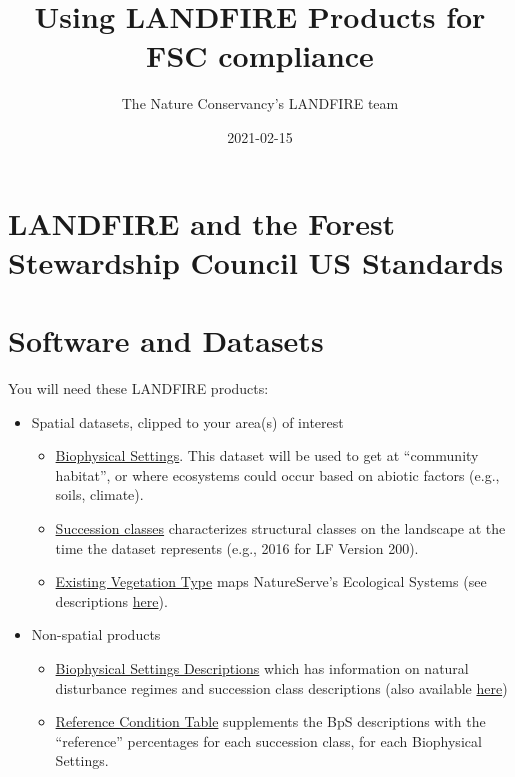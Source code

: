 \documentclass[
]{book}
\title{Using LANDFIRE Products for FSC compliance}
\author{The Nature Conservancy's LANDFIRE team}
\date{2021-02-15}
\providecommand{\tightlist}{%
  \setlength{\itemsep}{0pt}\setlength{\parskip}{0pt}}
\begin{document}
\maketitle

{
\setcounter{tocdepth}{1}
\tableofcontents
}
\hypertarget{landfire-and-the-forest-stewardship-council-us-standards}{%
\chapter{LANDFIRE and the Forest Stewardship Council US Standards}\label{landfire-and-the-forest-stewardship-council-us-standards}}

\hypertarget{softAndData}{%
\chapter{Software and Datasets}\label{softAndData}}

You will need these LANDFIRE products:

\begin{itemize}
\tightlist
\item
  Spatial datasets, clipped to your area(s) of interest

  \begin{itemize}
  \tightlist
  \item
    \href{https://www.landfire.gov/bps.php}{Biophysical Settings}. This dataset will be used to get at ``community habitat'', or where ecosystems could occur based on abiotic factors (e.g., soils, climate).
  \item
    \href{https://www.landfire.gov/sclass.php}{Succession classes} characterizes structural classes on the landscape at the time the dataset represents (e.g., 2016 for LF Version 200).
  \item
    \href{https://www.landfire.gov/evt.php}{Existing Vegetation Type} maps NatureServe's Ecological Systems (see descriptions \href{https://www.landfire.gov/documents/LANDFIRE_Ecological_Systems_Descriptions_CONUS.pdf}{here}).
  \end{itemize}
\item
  Non-spatial products

  \begin{itemize}
  \tightlist
  \item
    \href{http://landfirereview.org/search.php}{Biophysical Settings Descriptions} which has information on natural disturbance regimes and succession class descriptions (also available \href{https://tnc.box.com/s/d3ocvy969s1792m5885filjhktujp86e}{here})
  \item
    \href{https://tnc.box.com/s/d3ocvy969s1792m5885filjhktujp86e}{Reference Condition Table} supplements the BpS descriptions with the ``reference'' percentages for each succession class, for each Biophysical Settings.
  \end{itemize}
\end{itemize}
\end{document}
